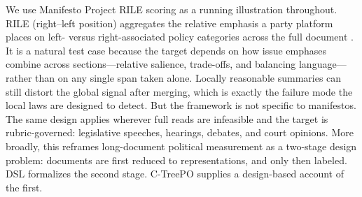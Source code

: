 \documentclass[11pt]{article}
\begin{document}
We use Manifesto Project RILE scoring as a running illustration throughout. RILE (right--left position) aggregates the relative emphasis a party platform places on left- versus right-associated policy categories across the full document \citep{ManifestoProject2025a}. It is a natural test case because the target depends on how issue emphases combine across sections---relative salience, trade-offs, and balancing language---rather than on any single span taken alone. Locally reasonable summaries can still distort the global signal after merging, which is exactly the failure mode the local laws are designed to detect. But the framework is not specific to manifestos. The same design applies wherever full reads are infeasible and the target is rubric-governed: legislative speeches, hearings, debates, and court opinions. More broadly, this reframes long-document political measurement as a two-stage design problem: documents are first reduced to representations, and only then labeled. DSL formalizes the second stage. C-TreePO supplies a design-based account of the first.

\clearpage

{\small}
\end{document}
